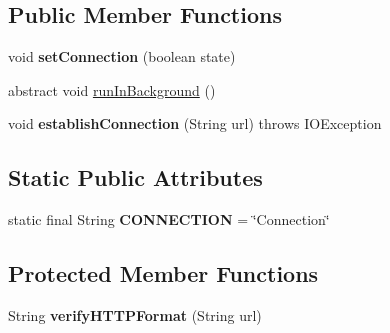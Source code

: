 \subsection*{Public Member Functions}
\begin{DoxyCompactItemize}
\item 
void {\bfseries set\+Connection} (boolean state)\hypertarget{classcom_1_1example_1_1sebastian_1_1tindertp_1_1internetTools_1_1MediaDownloader_a4c16ac9d418ed10daffb07e9ad322e0b}{}\label{classcom_1_1example_1_1sebastian_1_1tindertp_1_1internetTools_1_1MediaDownloader_a4c16ac9d418ed10daffb07e9ad322e0b}

\item 
abstract void \hyperlink{classcom_1_1example_1_1sebastian_1_1tindertp_1_1internetTools_1_1MediaDownloader_a66586cd5537ffb72797cbddd827a52b6}{run\+In\+Background} ()
\item 
void {\bfseries establish\+Connection} (String url)  throws I\+O\+Exception \hypertarget{classcom_1_1example_1_1sebastian_1_1tindertp_1_1internetTools_1_1MediaDownloader_ad4c3129f9cac2cf8db54c705787a9f9f}{}\label{classcom_1_1example_1_1sebastian_1_1tindertp_1_1internetTools_1_1MediaDownloader_ad4c3129f9cac2cf8db54c705787a9f9f}

\end{DoxyCompactItemize}
\subsection*{Static Public Attributes}
\begin{DoxyCompactItemize}
\item 
static final String {\bfseries C\+O\+N\+N\+E\+C\+T\+I\+ON} = \char`\"{}Connection\char`\"{}\hypertarget{classcom_1_1example_1_1sebastian_1_1tindertp_1_1internetTools_1_1MediaDownloader_a482dd76e7ba14df66401239e5a22d0aa}{}\label{classcom_1_1example_1_1sebastian_1_1tindertp_1_1internetTools_1_1MediaDownloader_a482dd76e7ba14df66401239e5a22d0aa}

\end{DoxyCompactItemize}
\subsection*{Protected Member Functions}
\begin{DoxyCompactItemize}
\item 
String {\bfseries verify\+H\+T\+T\+P\+Format} (String url)\hypertarget{classcom_1_1example_1_1sebastian_1_1tindertp_1_1internetTools_1_1MediaDownloader_afb5ac18510808a91eb05c464b54616d4}{}\label{classcom_1_1example_1_1sebastian_1_1tindertp_1_1internetTools_1_1MediaDownloader_afb5ac18510808a91eb05c464b54616d4}

\end{DoxyCompactItemize}

